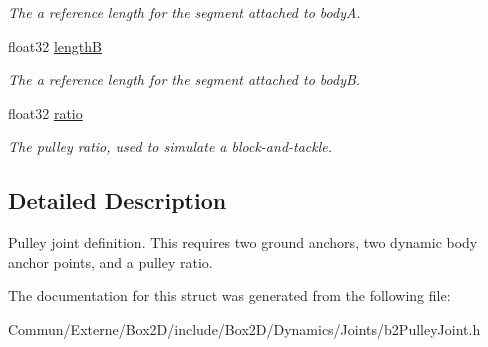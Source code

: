 \begin{DoxyCompactItemize}
\begin{DoxyCompactList}\small\item\em The a reference length for the segment attached to bodyA. \end{DoxyCompactList}\item 
float32 \hyperlink{structb2_pulley_joint_def_a5857d5b5b9880b6c8201ce3ee8c3eef0}{lengthB}\hypertarget{structb2_pulley_joint_def_a5857d5b5b9880b6c8201ce3ee8c3eef0}{}\label{structb2_pulley_joint_def_a5857d5b5b9880b6c8201ce3ee8c3eef0}

\begin{DoxyCompactList}\small\item\em The a reference length for the segment attached to bodyB. \end{DoxyCompactList}\item 
float32 \hyperlink{structb2_pulley_joint_def_af35074246aeacbf239c11682642b31f5}{ratio}\hypertarget{structb2_pulley_joint_def_af35074246aeacbf239c11682642b31f5}{}\label{structb2_pulley_joint_def_af35074246aeacbf239c11682642b31f5}

\begin{DoxyCompactList}\small\item\em The pulley ratio, used to simulate a block-\/and-\/tackle. \end{DoxyCompactList}\end{DoxyCompactItemize}


\subsection{Detailed Description}
Pulley joint definition. This requires two ground anchors, two dynamic body anchor points, and a pulley ratio. 

The documentation for this struct was generated from the following file\+:\begin{DoxyCompactItemize}
\item 
Commun/\+Externe/\+Box2\+D/include/\+Box2\+D/\+Dynamics/\+Joints/b2\+Pulley\+Joint.\+h\end{DoxyCompactItemize}
